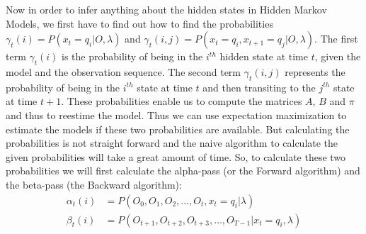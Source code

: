\documentclass[journal, compsoc]{IEEEtran}
\begin{document}
Now in order to infer anything about the hidden states in Hidden Markov Models, we first have to find out how to find the probabilities ${\gamma_t(i) = P(x_t = q_i | O, \lambda)}$ and ${\gamma_t(i, j) = P(x_t = q_i, x_{t + 1} = q_j | O, \lambda)}$.
The first term $\gamma_t(i)$ is the probability of being in the $i^{th}$ hidden state at time $t$, given the model and the observation sequence. The second term $\gamma_t(i, j)$ represents the probability of being in the $i^{th}$ state at time $t$ and then
transiting to the $j^{th}$ state at time $t + 1$. These probabilities enable us to compute the matrices $A$, $B$ and $\pi$ and thus to reestime the model. Thus we can use expectation maximization to estimate the models if these two probabilities are available.
But calculating the probabilities is not straight forward and the naive algorithm to calculate the given probabilities will take a great amount of time. So, to calculate these two probabilities we will first calculate the alpha-pass (or the Forward algorithm) and the beta-pass (the Backward algorithm):
\begin{equation}
\begin{aligned}
    \alpha_t(i) &= P(O_0, O_1, O_2, \ldots, O_t, x_t = q_i | \lambda)\\
    \beta_t(i) &= P(O_{t + 1}, O_{t + 2}, O_{t + 3}, \ldots, O_{T - 1} | x_{t} = q_i, \lambda)
\end{aligned}
\end{equation}
\end{document}
